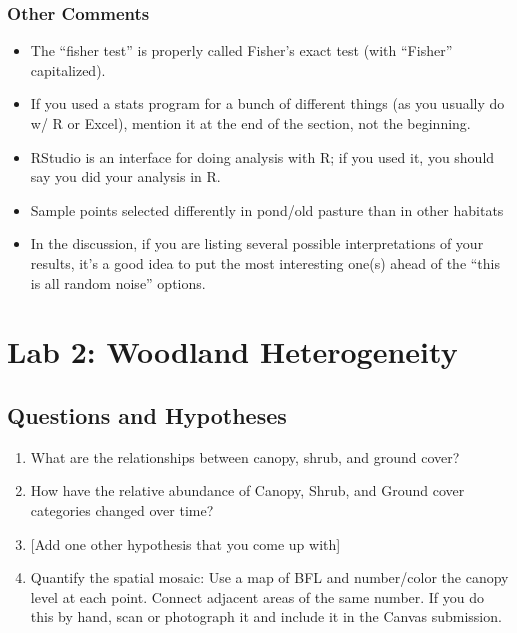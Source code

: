 \documentclass[]{book}
\providecommand{\tightlist}{%
  \setlength{\itemsep}{0pt}\setlength{\parskip}{0pt}}
\begin{document}
\subsection{Other Comments}\label{other-comments}

\begin{itemize}
\tightlist
\item
  The ``fisher test'' is properly called Fisher's exact test (with
  ``Fisher'' capitalized).
\item
  If you used a stats program for a bunch of different things (as you
  usually do w/ R or Excel), mention it at the end of the section, not
  the beginning.
\item
  RStudio is an interface for doing analysis with R; if you used it, you
  should say you did your analysis in R.
\item
  Sample points selected differently in pond/old pasture than in other
  habitats
\item
  In the discussion, if you are listing several possible interpretations
  of your results, it's a good idea to put the most interesting one(s)
  ahead of the ``this is all random noise'' options.
\end{itemize}

\chapter{Lab 2: Woodland Heterogeneity}\label{Lab2}

\section{Questions and Hypotheses}\label{questions-and-hypotheses}

\begin{enumerate}
\def\labelenumi{\arabic{enumi}.}
\tightlist
\item
  What are the relationships between canopy, shrub, and ground cover?
\item
  How have the relative abundance of Canopy, Shrub, and Ground cover
  categories changed over time?
\item
  {[}Add one other hypothesis that you come up with{]}
\item
  Quantify the spatial mosaic: Use a map of BFL and number/color the
  canopy level at each point. Connect adjacent areas of the same number.
  If you do this by hand, scan or photograph it and include it in the
  Canvas submission.
\end{enumerate}
\end{document}
